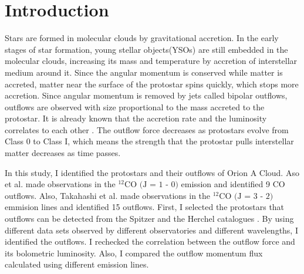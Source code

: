 
\section{Introduction}

Stars are formed in molecular clouds by gravitational accretion. In the early stages of star formation, young stellar objects(YSOs) are still embedded in the molecular clouds, increasing its mass and temperature by accretion of interstellar medium around it. Since the angular momentum is conserved while matter is accreted, matter near the surface of the protostar spins quickly, which stops more accretion. Since angular momentum is removed by jets called bipolar outflows, outflows are observed with size proportional to the mass accreted to the protostar\cite{bontemps1996evolution}. 
It is already known that the accretion rate and the luminosity correlates to each other \cite{kang2013outflow}. The outflow force decreases as protostars evolve from Class 0 to Class I, which means the strength that the protostar pulls interstellar matter decreases as time passes. 

In this study, I identified the protostars and their outflows of Orion A Cloud. Aso et al. \cite{aso2000dense} made observations in the $^{12}\textrm{CO (J = 1 - 0)}$ emission and identified 9 CO outflows. Also, Takahashi et al. \cite{takahashi2008millimeter} made observations in the $^{12}\textrm{CO (J = 3 - 2)}$ emmision lines and identified 15 outflows. First, I selected the protostars that outflows can be detected from the Spitzer and the Herchel catalogues \cite{megeath2012spitzer, furlan2016herschel}. By using different data sets observed by different observatories and different wavelengths, I identified the outflows. I rechecked the correlation between the outflow force and its bolometric luminosity. Also, I compared the outflow momentum flux calculated using different emission lines. \\
